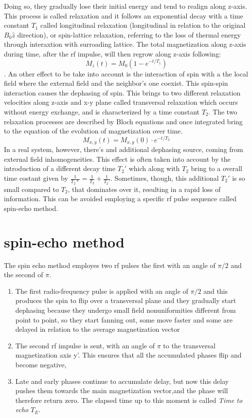 \documentclass[12pt]{report}
\begin{document}
Doing so, they gradually lose their initial energy and tend to realign along z-axis.
This process is called relaxation and it follows an exponential decay with a time constant $T_1$ called longitudinal relaxation (longitudinal in relation to the original $B_0 \hat z$ direction), or spin-lattice relaxation, referring to the loss of thermal energy through interaxtion with surroading lattice. The total magnetization along z-axis during time, after the rf impulse, will then regrow along z-axis following:
\begin{equation}
M_z(t) = M_0 (1-e^{-t/T_1})
\end{equation}.
An other effect to be take into account is the interaction of spin with a the local field where the external field and the neighbor's one coexist. This spin-spin interaction causes the dephasing of spin. This brings to two different relaxation velocities along z-axis and x-y plane called transversal relaxation which occurs without energy exchange, and is characterized by a time constant $T_2$. The two relaxation processes are described by Bloch equations and once integrated bring to the equation of the evolution of magnetization over time.
\begin{equation}
M_{x, y}(t) = M_{x,y}(0)\cdot e^{-t/T_2}
\end{equation}
In a real system, however, there's and additional dephasing source, coming from external field inhomogeneities.
This effect is often taken into account by the introduction of a different decay time $T_2'$ which along with $T_2$ bring to a overall time costant given by $\frac{1}{T_2*} = \frac{1}{T_2}+\frac{1}{T_2'}$.
Sometimes, though, this additional $T_2'$ is so small compared to $T_2$, that dominates over it, resulting in a rapid loss of information.
This can be avoided employing a specific rf pulse sequence called spin-echo method.
\section{spin-echo method}
The spin echo method employes two rf pulses the first with an angle of $\pi/2$ and the second of $\pi$.
\begin{enumerate}
\item The first radio-frequency pulse is applied with an angle of $\pi/2$ and this produces the spin to flip over a transversal plane and they gradually start dephasing because they undergo small field nonuniformities different from point to point, so they start fanning out, some move faster and some are delayed in relation to the average magnetization vector
\item The second rf impulse is sent, with an angle of $\pi$ to the transversal magnetization axis y'. This ensures that all the accumulated phases flip and become negative,
\item Late and early phases continue to accumulate delay, but now this delay pushes them towards the main magnetization vector,and the phase will therefore return zero. The elapsed time up to this moment is called \emph{Time to echo} $T_E$.
\end{enumerate}
\end{document}

